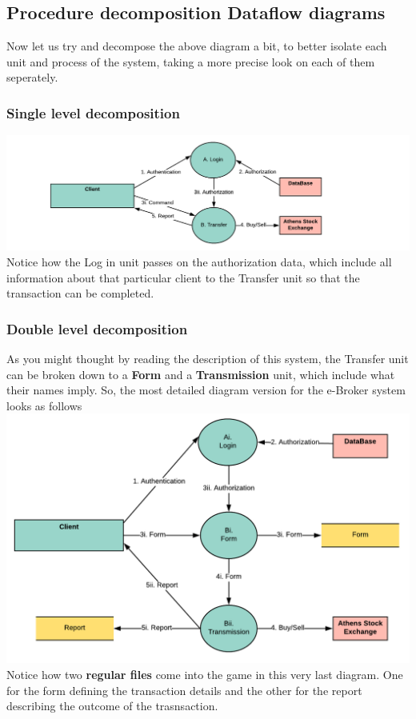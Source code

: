 \documentclass{article}
\begin{document}
\subsection{Procedure decomposition Dataflow diagrams}
Now let us try and decompose the above diagram a bit, to better isolate each unit and process of the system,
taking a more precise look on each of them seperately.
\subsubsection{Single level decomposition}
\includegraphics[scale=0.8]{dataflow_1.png}\\
Notice how the Log in unit passes on the authorization data,
which include all information about that particular client to the Transfer
unit so that the transaction can be completed.

\newpage
\subsubsection{Double level decomposition}
As you might thought by reading the description of this system, the Transfer unit can be broken down to
a \textbf{Form} and a \textbf{Transmission} unit, which include what their names imply. So, the most detailed diagram version
for the e-Broker system looks as follows\\
\hspace*{8mm}\includegraphics[scale=0.8]{dataflow_2.png}\\
Notice how two \textbf{regular files} come into the game in this very last diagram. One for the form
defining the transaction details and the other for the report describing the outcome of the trasnsaction.
\end{document}
